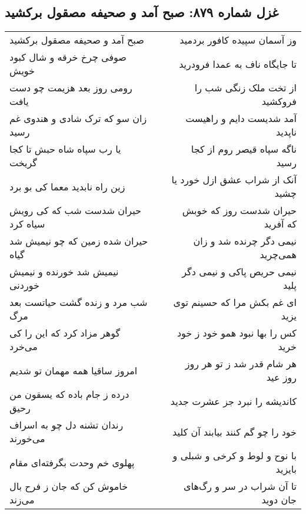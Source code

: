 \begin{center}
\section*{غزل شماره ۸۷۹: صبح آمد و صحیفه مصقول برکشید}
\label{sec:0879}
\begin{longtable}{l p{0.5cm} r}
صبح آمد و صحیفه مصقول برکشید
&&
وز آسمان سپیده کافور بردمید
\\
صوفی چرخ خرقه و شال کبود خویش
&&
تا جایگاه ناف به عمدا فرودرید
\\
رومی روز بعد هزیمت چو دست یافت
&&
از تخت ملک زنگی شب را فروکشید
\\
زان سو که ترک شادی و هندوی غم رسید
&&
آمد شدیست دایم و راهیست ناپدید
\\
یا رب سپاه شاه حبش تا کجا گریخت
&&
ناگه سپاه قیصر روم از کجا رسید
\\
زین راه نابدید معما کی بو برد
&&
آنک از شراب عشق ازل خورد یا چشید
\\
حیران شدست شب که کی رویش سیاه کرد
&&
حیران شدست روز که خوبش که آفرید
\\
حیران شده زمین که چو نیمیش شد گیاه
&&
نیمی دگر چرنده شد و زان همی‌چرید
\\
نیمیش شد خورنده و نیمیش خوردنی
&&
نیمی حریص پاکی و نیمی دگر پلید
\\
شب مرد و زنده گشت حیاتست بعد مرگ
&&
ای غم بکش مرا که حسینم توی یزید
\\
گوهر مزاد کرد که این را کی می‌خرد
&&
کس را بها نبود همو خود ز خود خرید
\\
امروز ساقیا همه مهمان تو شدیم
&&
هر شام قدر شد ز تو هر روز روز عید
\\
درده ز جام باده که یسقون من رحیق
&&
کاندیشه را نبرد جز عشرت جدید
\\
رندان تشنه دل چو به اسراف می‌خورند
&&
خود را چو گم کنند بیابند آن کلید
\\
پهلوی خم وحدت بگرفته‌ای مقام
&&
با نوح و لوط و کرخی و شبلی و بایزید
\\
خاموش کن که جان ز فرح بال می‌زند
&&
تا آن شراب در سر و رگ‌های جان دوید
\\
\end{longtable}
\end{center}
